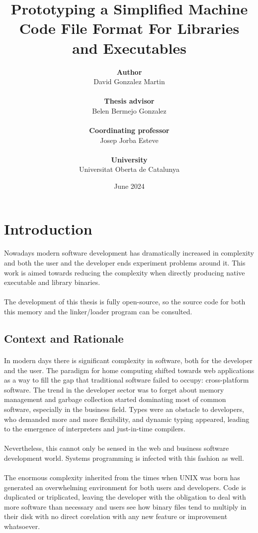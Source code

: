\documentclass[12pt]{article}
\title{\textbf{Prototyping a Simplified Machine Code File Format For Libraries and Executables}}
\author{\textbf{Author}\\David Gonzalez Martin\\\\\textbf{Thesis advisor}\\Belen Bermejo Gonzalez\\\\\textbf{Coordinating professor}\\Josep Jorba Esteve\\\\\textbf{University}\\Universitat Oberta de Catalunya}
\date{June 2024}
\begin{document}
	\maketitle{}
	\newpage
	\tableofcontents
	\newpage
	\section{Introduction}
	\paragraph{}Nowadays modern software development has dramatically increased in complexity and both the user and the developer ends experiment problems around it. This work is aimed towards reducing the complexity when directly producing native executable and library binaries.
	\paragraph{}The development of this thesis is fully open-source, so the source code for both this memory and the linker/loader program can be consulted\cite{self}.
	\subsection{Context and Rationale}
	\paragraph{}In modern days there is significant complexity in software, both for the developer and the user. The paradigm for home computing shifted towards web applications as a way to fill the gap that traditional software failed to occupy: cross-platform software. The trend in the developer sector was to forget about memory management and garbage collection started dominating most of common software, especially in the business field. Types were an obstacle to developers, who demanded more and more flexibility, and dynamic typing appeared, leading to the emergence of interpreters and just-in-time compilers.
	\paragraph{}Nevertheless, this cannot only be sensed in the web and business software development world. Systems programming is infected with this fashion as well.
	\paragraph{} The enormous complexity inherited from the times when UNIX was born has generated an overwhelming environment for both users and developers. Code is duplicated or triplicated, leaving the developer with the obligation to deal with more software than necessary and users see how binary files tend to multiply in their disk with no direct corelation with any new feature or improvement whatsoever.
\end{document}
